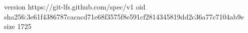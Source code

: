 version https://git-lfs.github.com/spec/v1
oid sha256:3e61f4386787cacacd71e68f3575f8e591cf2814345819dd2c36a77c7104ab9e
size 1725
